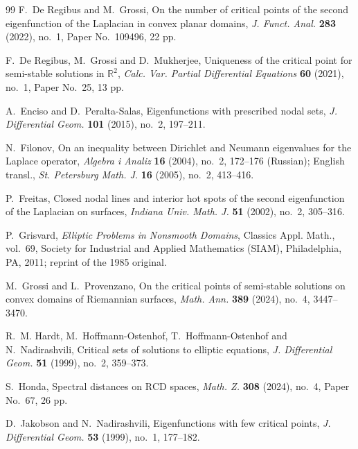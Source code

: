\documentclass[11pt]{amsart}
\numberwithin{equation}{section}
\begin{document}
\begin{thebibliography}{99}
F.~De Regibus and M.~Grossi,
\newblock On the number of critical points of the second eigenfunction of the Laplacian
in convex planar domains,
\newblock \emph{J. Funct. Anal.} \textbf{283} (2022), no.~1,
Paper No.~109496, 22 pp.

F.~De Regibus, M.~Grossi and D.~Mukherjee,
\newblock Uniqueness of the critical point for semi-stable solutions in
$\mathbb{R}^2$,
\newblock \emph{Calc. Var. Partial Differential Equations} \textbf{60} (2021),
no.~1, Paper No.~25, 13 pp.

A.~Enciso and D.~Peralta-Salas,
\newblock Eigenfunctions with prescribed nodal sets,
\newblock \emph{J. Differential Geom.} \textbf{101} (2015), no.~2, 197--211.

N.~Filonov,
\newblock On an inequality between Dirichlet and Neumann eigenvalues for the Laplace
operator,
\newblock \emph{Algebra i Analiz} \textbf{16} (2004), no.~2, 172--176
(Russian);
English transl., \emph{St. Petersburg Math. J.} \textbf{16} (2005), no.~2,
413--416.

P.~Freitas,
\newblock Closed nodal lines and interior hot spots of the second eigenfunction of
the Laplacian on surfaces,
\newblock \emph{Indiana Univ. Math. J.} \textbf{51} (2002), no.~2, 305--316.

P.~Grisvard,
\newblock \emph{Elliptic Problems in Nonsmooth Domains},
\newblock Classics Appl. Math., vol.~69, Society for Industrial and Applied
Mathematics (SIAM), Philadelphia, PA, 2011; reprint of the 1985 original.

M.~Grossi and L.~Provenzano,
\newblock On the critical points of semi-stable solutions on convex domains of
Riemannian surfaces,
\newblock \emph{Math. Ann.} \textbf{389} (2024), no.~4, 3447--3470.

R.~M. Hardt, M.~Hoffmann-Ostenhof, T.~Hoffmann-Ostenhof and N.~Nadirashvili,
\newblock Critical sets of solutions to elliptic equations,
\newblock \emph{J. Differential Geom.} \textbf{51} (1999), no.~2, 359--373.

S.~Honda,
\newblock Spectral distances on $\mathrm{RCD}$ spaces,
\newblock \emph{Math. Z.} \textbf{308} (2024), no.~4, Paper No.~67, 26 pp.

D.~Jakobson and N.~Nadirashvili,
\newblock Eigenfunctions with few critical points,
\newblock \emph{J. Differential Geom.} \textbf{53} (1999), no.~1, 177--182.


\end{thebibliography}
\end{document}
